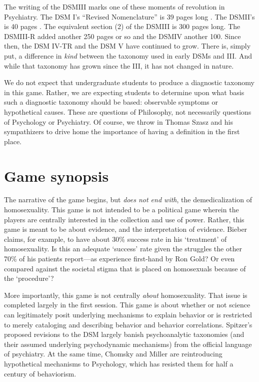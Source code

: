 \begin{refsection}
The writing of the DSMIII marks one of these moments of revolution in Psychiatry. The DSM I’s “Revised Nomenclature” is 39 pages long . The DSMII’s is 40 pages . The equivalent section (2) of the DSMIII is 300 pages long. The DSMIII-R added another 250 pages or so and the DSMIV another 100. Since then, the DSM IV-TR and the DSM V have continued to grow. There is, simply put, a difference in \emph{kind} between the taxonomy used in early DSMs and III. And while that taxonomy has grown since the III, it has not changed in nature.

We do not expect that undergraduate students to produce a diagnostic taxonomy in this game. Rather, we are expecting students to determine upon what basis such a diagnostic taxonomy should be based: observable symptoms or hypothetical causes. These are questions of Philosophy, not necessarily questions of Psychology or Psychiatry. Of course, we throw in Thomas Szasz and his sympathizers to drive home the importance of having a definition in the first place.

\section{Game synopsis}
\label{gamesynopsis}

The narrative of the game begins, but \emph{does not end with}, the demedicalization of homosexuality. This game is not intended to be a political game wherein the players are centrally interested in the collection and use of power. Rather, this game is meant to be about evidence, and the interpretation of evidence. Bieber claims, for example, to have about 30\% success rate in his ‘treatment’ of homosexuality. Is this an adequate ‘success’ rate given the struggles the other 70\% of his patients report---as experience first-hand by Ron Gold? Or even compared against the societal stigma that is placed on homosexuals because of the ‘procedure’?

More importantly, this game is not centrally \emph{about} homosexuality. That issue is completed largely in the first session. This game is about whether or not science can legitimately posit underlying mechanisms to explain behavior or is restricted to merely cataloging and describing behavior and behavior correlations. Spitzer’s proposed revisions to the DSM largely banish psychoanalytic taxonomies (and their assumed underlying psychodynamic mechanisms) from the official language of psychiatry. At the same time, Chomsky and Miller are reintroducing hypothetical mechanisms to Psychology, which has resisted them for half a century of behaviorism.


\end{refsection}
